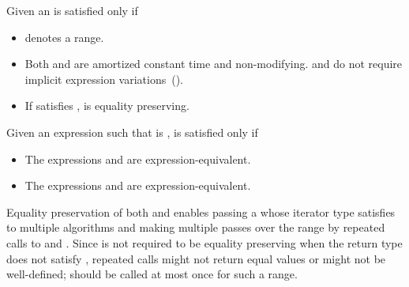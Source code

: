 \begin{itemdescr}
\pnum
Given an  is satisfied only if

\begin{itemize}
\item {} denotes a range.

\item Both  and  are amortized constant time
and non-modifying. \enternote {} and  do not require
implicit expression variations~(). \exitnote

\item If  satisfies ,
 is equality preserving.
\end{itemize}

\begin{addedblock}
\pnum
Given an expression  such that  is ,
 is satisfied only if
\begin{itemize}
\item
  The expressions  and 
  are expression-equivalent.

\item
  The expressions  and 
  are expression-equivalent.
\end{itemize}

\end{addedblock}
\end{itemdescr}

\pnum \enternote
Equality preservation of both  and  enables passing a 
whose iterator type satisfies 
to multiple algorithms and
making multiple passes over the range by repeated calls to  and .
Since  is not required to be equality preserving when the return type does
not satisfy , repeated calls might not return equal values or
might not be well-defined;  should be called at most once for such a range.
\exitnote

